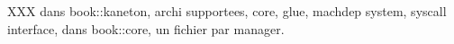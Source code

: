 XXX dans book::kaneton, archi supportees, core, glue, machdep system, syscall
    interface, dans book::core, un fichier par manager.
